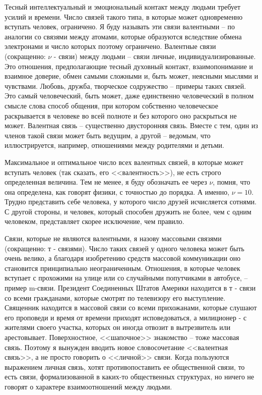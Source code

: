\documentclass{book}
\begin{document}
Тесный интеллектуальный и эмоциональный контакт между людьми требует усилий и времени. Число связей такого типа, в которые может одновременно вступать человек, ограничено. Я буду называть эти связи валентными --  по аналогии со связями между атомами, которые образуются вследствие обмена электронами и число которых поэтому ограничено. Валентные связи (сокращенно: $\nu$ -  связи) между людьми -- связи личные, индивидуализированные. Это отношения, предполагающие тес­ный духовный контакт, взаимопонимание и взаимное доверие, обмен самыми сложными и, быть может, неясными мыслями и чувствами. Любовь, дружба, творческое содружество -- при­меры таких связей. Это самый человеческий, быть может, даже единственно человеческий в полном смысле слова способ обще­ния, при котором собственно человеческое раскрывается в чело­веке во всей полноте и без которого оно раскрыться не может. Валентная связь -- существенно двусторонняя связь. Вместе с тем, один из членов такой связи может быть ведущим, а другой -- ведомым, что 
иллюстрируется, например, отношениями между родителями и детьми.

Максимальное и оптимальное число всех валентных связей, в которые может вступать человек (так сказать, его <<валент­ность>>), не есть строго определенная величина. Тем не менее, я буду обозначать ее через $\nu$,  помня, что она определена, как го­ворят физики, с точностью до порядка. А именно, $\nu = 10$. Трудно представить себе человека, у которого число друзей исчисляется сотнями. С другой стороны, и человек, который спо­собен дружить не более, чем с одним человеком, представляет скорее исключение, чем правило.

Связи, которые не являются валентными, я назову массовы­ми связями  (сокращенно: т -  связями). Число таких связей у одного человека может быть очень велико, а благодаря изоб­ретению средств массовой коммуникации оно становится принципиально неограниченным. Отношения, в которые чело­век вступает с прохожими на улице или со случайными попут­чиками в автобусе, -- пример m-связи. Президент Соединенных Штатов Америки находится в т -  связи со всеми гражданами, которые смотрят по телевизору его выступление. Священник находится в массовой связи со всеми прихожанами, которые слушают его проповеди и время от времени приходят испове­доваться, а милиционер - с жителями своего участка, которых он иногда отвозит в вытрезвитель или арестовывает. Поверх­ностное, <<шапочное>> знакомство -- тоже массовая связь. Поэтому я вынужден вводить новое словосочетание <<валентная связь>>, а не просто говорить о <<личной>> связи. Когда пользуют­ся выражением личная связь,  хотят противопоставить ее об­щественной связи,  то есть связи, 
формализованной в каких-то общественных структурах, но ничего не говорят о характере взаимоотношений между людьми.
\end{document}
